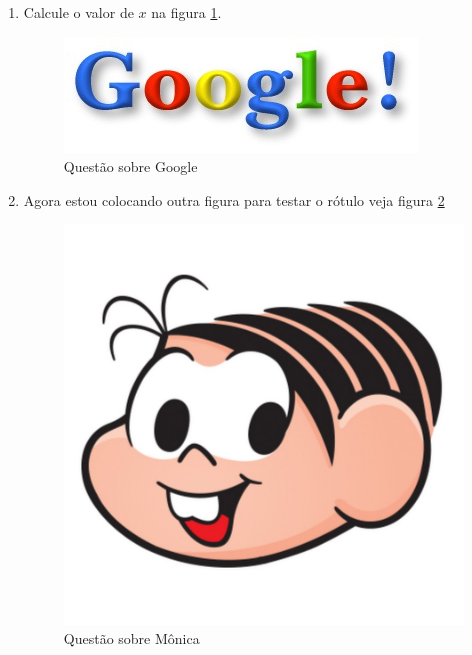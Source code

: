\documentclass[a4paper, 12pt]{article}
\begin{document}
	\begin{enumerate}
		\item Calcule o valor de $x$ na figura \ref{googlelogo}.
		
	\begin{figure}[htb]
	\centering
		\includegraphics[scale=1]{img/google.jpg}
		\caption{Questão sobre Google}
		\label{googlelogo}
	\end{figure}
	
	\item Agora estou colocando outra figura para testar o rótulo veja figura \ref{monica}
	
	\begin{figure}[htb]
	\centering
		\includegraphics[scale=0.2]{img/monica.jpg}
		\caption{Questão sobre Mônica}
		\label{monica}
	\end{figure}
	
	\end{enumerate}
	
\end{document}
